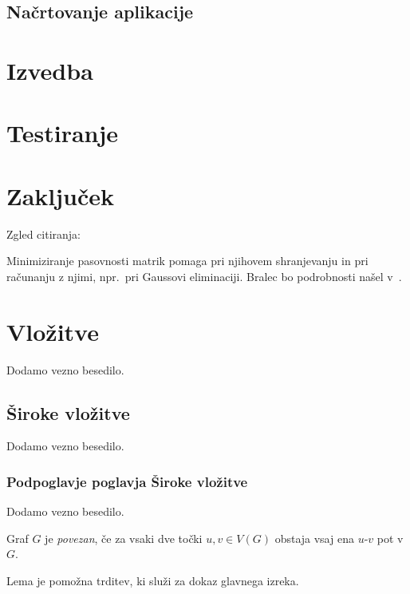 \documentclass[12pt,a4paper,titlepage,openany]{report}
\begin{document}
\section{Načrtovanje aplikacije}

\chapter{Izvedba}
\thispagestyle{fancy}

\chapter{Testiranje}
\thispagestyle{fancy}

\chapter{Zaključek}
\thispagestyle{fancy}





\medskip
\noindent Zgled citiranja:

\medskip
Minimiziranje pasovnosti matrik pomaga pri njihovem shranjevanju in pri računanju z njimi, npr.~pri Gaussovi eliminaciji. Bralec bo podrobnosti našel v~\cite{Chinn, George, Strang}.


\chapter{Vložitve}
\thispagestyle{fancy}

Dodamo vezno besedilo.

\section{Široke vložitve}\label{siroke}

Dodamo vezno besedilo.

\subsection{Podpoglavje poglavja Široke vložitve}

Dodamo vezno besedilo.

\begin{defi}
Graf $G$ je {\em povezan}, če za vsaki dve točki $u,v\in V(G)$ obstaja vsaj ena $u$-$v$ pot v $G$.
\end{defi}

\begin{lema}
Lema je pomožna trditev, ki služi za dokaz glavnega izreka.
\end{lema}
\end{document}
